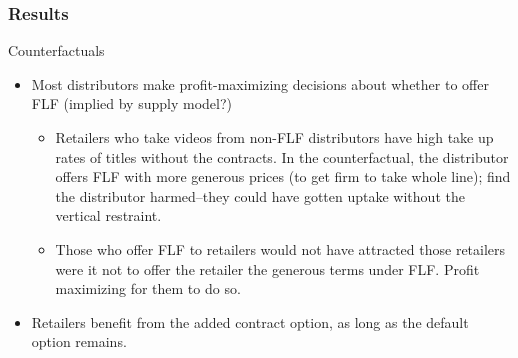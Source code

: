 \documentclass[notes=show]{beamer}
\begin{document}
\begin{frame}
\frametitle{Results}

Counterfactuals

\begin{itemize}
\item Most distributors make profit-maximizing decisions about whether to
offer FLF (implied by supply model?)

\begin{itemize}
\item Retailers who take videos from non-FLF distributors have high take up
rates of titles without the contracts. In the counterfactual, the
distributor offers FLF with more generous prices (to get firm to take whole
line); find the distributor harmed--they could have gotten uptake without
the vertical restraint.

\item Those who offer FLF to retailers would not have attracted those
retailers were it not to offer the retailer the generous terms under FLF.
Profit maximizing for them to do so.
\end{itemize}

\item Retailers benefit from the added contract option, as long as the
default option remains.
\end{itemize}
\end{frame}

\end{document}
